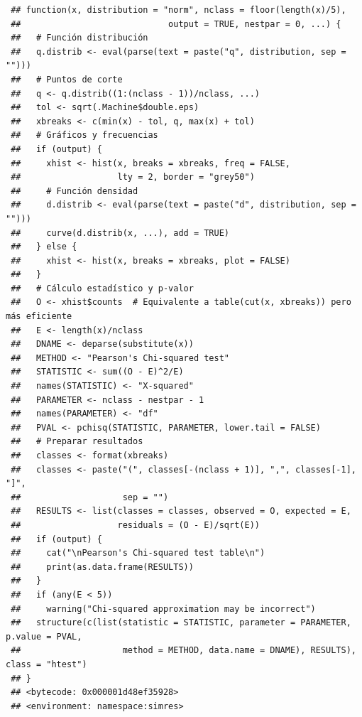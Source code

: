 \documentclass[
]{book}
\theoremstyle{break}
\theoremstyle{nonumberplain}
\begin{document}
\begin{verbatim}
 ## function(x, distribution = "norm", nclass = floor(length(x)/5),
 ##                             output = TRUE, nestpar = 0, ...) {
 ##   # Función distribución
 ##   q.distrib <- eval(parse(text = paste("q", distribution, sep = "")))
 ##   # Puntos de corte
 ##   q <- q.distrib((1:(nclass - 1))/nclass, ...)
 ##   tol <- sqrt(.Machine$double.eps)
 ##   xbreaks <- c(min(x) - tol, q, max(x) + tol)
 ##   # Gráficos y frecuencias
 ##   if (output) {
 ##     xhist <- hist(x, breaks = xbreaks, freq = FALSE,
 ##                   lty = 2, border = "grey50")
 ##     # Función densidad
 ##     d.distrib <- eval(parse(text = paste("d", distribution, sep = "")))
 ##     curve(d.distrib(x, ...), add = TRUE)
 ##   } else {
 ##     xhist <- hist(x, breaks = xbreaks, plot = FALSE)
 ##   }
 ##   # Cálculo estadístico y p-valor
 ##   O <- xhist$counts  # Equivalente a table(cut(x, xbreaks)) pero más eficiente
 ##   E <- length(x)/nclass
 ##   DNAME <- deparse(substitute(x))
 ##   METHOD <- "Pearson's Chi-squared test"
 ##   STATISTIC <- sum((O - E)^2/E)
 ##   names(STATISTIC) <- "X-squared"
 ##   PARAMETER <- nclass - nestpar - 1
 ##   names(PARAMETER) <- "df"
 ##   PVAL <- pchisq(STATISTIC, PARAMETER, lower.tail = FALSE)
 ##   # Preparar resultados
 ##   classes <- format(xbreaks)
 ##   classes <- paste("(", classes[-(nclass + 1)], ",", classes[-1], "]",
 ##                    sep = "")
 ##   RESULTS <- list(classes = classes, observed = O, expected = E,
 ##                   residuals = (O - E)/sqrt(E))
 ##   if (output) {
 ##     cat("\nPearson's Chi-squared test table\n")
 ##     print(as.data.frame(RESULTS))
 ##   }
 ##   if (any(E < 5))
 ##     warning("Chi-squared approximation may be incorrect")
 ##   structure(c(list(statistic = STATISTIC, parameter = PARAMETER, p.value = PVAL,
 ##                    method = METHOD, data.name = DNAME), RESULTS), class = "htest")
 ## }
 ## <bytecode: 0x000001d48ef35928>
 ## <environment: namespace:simres>
\end{verbatim}
\end{document}
